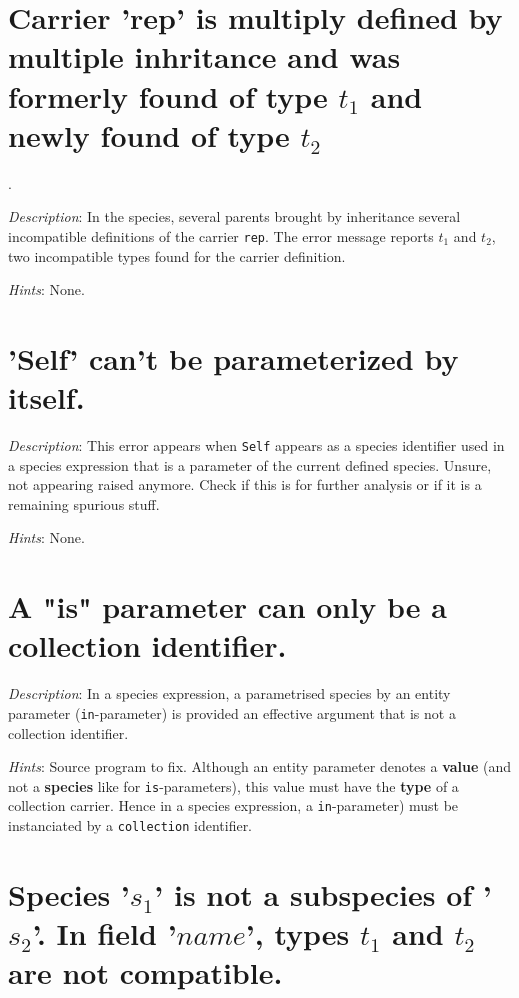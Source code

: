\section*{Carrier 'rep' is multiply defined by multiple inhritance and
  was formerly found of type $t_1$ and newly found of type $t_2$}.

{\em Description}: In the species, several parents brought by
inheritance several incompatible definitions of the carrier
{\tt rep}. The error message reports $t_1$ and $t_2$, two incompatible
types found for the carrier definition.

{\em Hints}: None.



\section*{'Self' can't be parameterized by itself.}

{\em Description}: This error appears when {\tt Self} appears as a
species identifier used in a species expression that is a parameter of
the current defined species.
{\color{red} Unsure, not appearing raised anymore. Check if this is
  for further analysis or if it is a remaining spurious stuff.}

{\em Hints}: None.



\section*{A "is" parameter can only be a collection identifier.}

{\em Description}: In a species expression, a parametrised species by
an entity parameter ({\tt in}-parameter) is provided an effective
argument that is not a collection identifier.

{\em Hints}: Source program to fix. Although an entity parameter
denotes a {\bf value} (and not a {\bf species} like for
{\tt is}-parameters), this value must have the {\bf type} of a
collection carrier. Hence in a species expression, a
{\tt in}-parameter) must be instanciated by a {\tt collection}
identifier.


\section*{Species '$s_1$' is not a subspecies of '$s_2$'. In field
  '$name$', types $t_1$ and $t_2$ are not compatible.}

